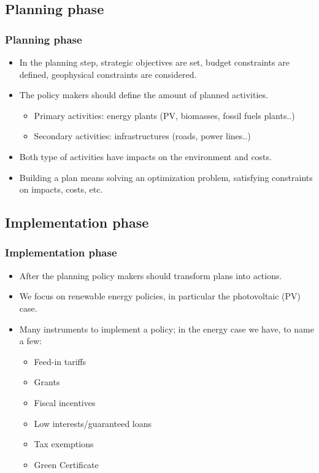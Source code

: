 \documentclass{beamer}
\begin{document}
\subsection{Planning phase}
	\begin{frame}
	\frametitle{Planning phase}
			\begin{itemize}
			\item In the planning step, strategic objectives are set, budget constraints are defined, geophysical constraints are considered.
			\item The policy makers should define the amount of planned activities.
			\begin{itemize}
				\item Primary activities: energy plants (PV, biomasses, fossil fuels plants..)
				\item Secondary activities: infrastructures (roads, power lines..)
			\end{itemize}
			\item Both type of activities have impacts on the environment and costs.
			\item Building a plan means solving an optimization problem, satisfying constraints on impacts, costs, etc.
		\end{itemize}
	\end{frame}


\subsection{Implementation phase}
	\begin{frame}
	\frametitle{Implementation phase}
		\begin{itemize}
			\item After the planning policy makers should transform plans into actions.
			\item We focus on renewable energy policies, in particular the photovoltaic (PV) case.
			\item Many instruments to implement a policy; in the energy case we have, to name a few:
			\begin{itemize}
				\item Feed-in tariffs 
				\item Grants
				\item Fiscal incentives
				\item Low interests/guaranteed loans
				\item Tax exemptions
				\item Green Certificate
			\end{itemize}
		\end{itemize}
	\end{frame}
	
\end{document}

